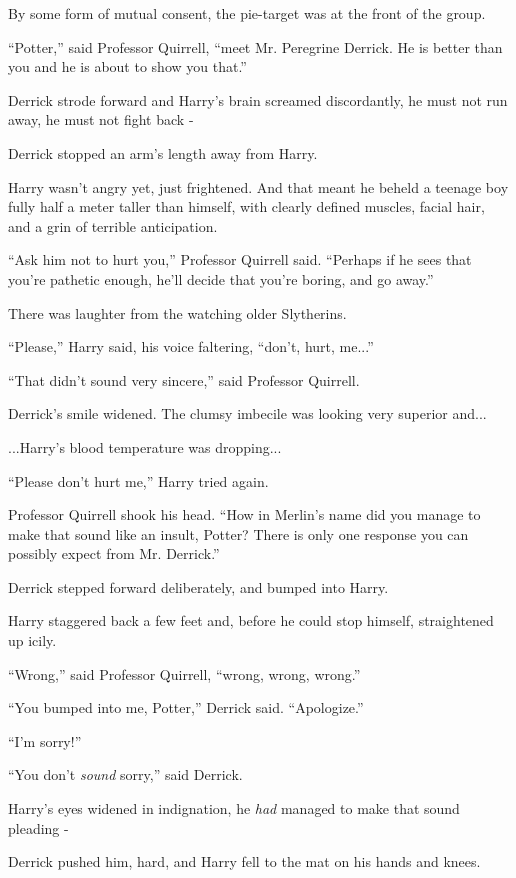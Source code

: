 By some form of mutual consent, the pie-target was at the front of the
group.

``Potter,'' said Professor Quirrell, ``meet Mr. Peregrine Derrick. He is
better than you and he is about to show you that.''

Derrick strode forward and Harry's brain screamed discordantly, he must
not run away, he must not fight back -

Derrick stopped an arm's length away from Harry.

Harry wasn't angry yet, just frightened. And that meant he beheld a
teenage boy fully half a meter taller than himself, with clearly defined
muscles, facial hair, and a grin of terrible anticipation.

``Ask him not to hurt you,'' Professor Quirrell said. ``Perhaps if he
sees that you're pathetic enough, he'll decide that you're boring, and
go away.''

There was laughter from the watching older Slytherins.

``Please,'' Harry said, his voice faltering, ``don't, hurt, me...''

``That didn't sound very sincere,'' said Professor Quirrell.

Derrick's smile widened. The clumsy imbecile was looking very superior
and...

...Harry's blood temperature was dropping...

``Please don't hurt me,'' Harry tried again.

Professor Quirrell shook his head. ``How in Merlin's name did you manage
to make that sound like an insult, Potter? There is only one response
you can possibly expect from Mr. Derrick.''

Derrick stepped forward deliberately, and bumped into Harry.

Harry staggered back a few feet and, before he could stop himself,
straightened up icily.

``Wrong,'' said Professor Quirrell, ``wrong, wrong, wrong.''

``You bumped into me, Potter,'' Derrick said. ``Apologize.''

``I'm sorry!''

``You don't \emph{sound} sorry,'' said Derrick.

Harry's eyes widened in indignation, he \emph{had} managed to make that
sound pleading -

Derrick pushed him, hard, and Harry fell to the mat on his hands and
knees.

